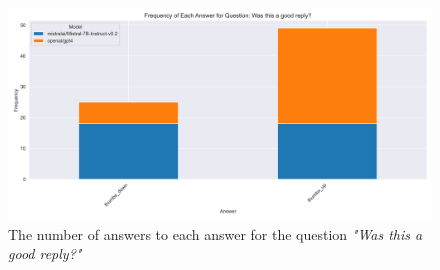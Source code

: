 \begin{figure}[H]
    \centering
    \includegraphics[width=\textwidth]{results/plots/assets/feedback-02-frequency-of-answer-for-question-per-model-2e09fd.png}
    \caption{The number of answers to each answer for the question \textit{"Was this a good reply?"}}
    \label{fig:feedback_02_frequency_of_answer_for_question_per_model_2e09fd}
\end{figure}